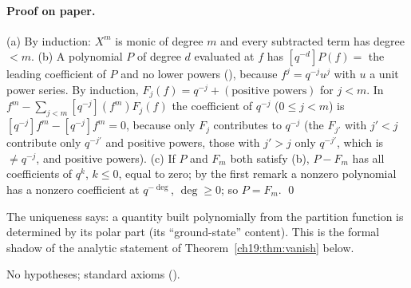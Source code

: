 \paragraph{Proof on paper.}  (a) By induction: $X^m$ is monic of degree $m$ and every subtracted term has degree $<m$.
(b) A polynomial $P$ of degree $d$ evaluated at $f$ has $[q^{-d}]P(f)=$ the leading coefficient of $P$ and no lower
powers (), because $f^j=q^{-j}u^j$ with $u$ a unit power series.  By induction,
$F_j(f)=q^{-j}+(\text{positive powers})$ for $j<m$.  In $f^m-\sum_{j<m}[q^{-j}](f^m)F_j(f)$ the coefficient of $q^{-j}$
($0\le j<m$) is $[q^{-j}]f^m-[q^{-j}]f^m=0$, because only $F_j$ contributes to $q^{-j}$ (the $F_{j'}$ with $j'<j$ contribute
only $q^{-j'}$ and positive powers, those with $j'>j$ only $q^{-j'}$, which is $\ne q^{-j}$, and positive powers).  (c) If
$P$ and $F_m$ both satisfy (b), $P-F_m$ has all coefficients of $q^{k}$, $k\le0$, equal to zero; by the first remark a
nonzero polynomial has a nonzero coefficient at $q^{-\deg}$, $\deg\ge0$; so $P=F_m$. \qed
\begin{physics}
The uniqueness says: a quantity built polynomially from the partition function is determined by its polar part
(its ``ground-state'' content).  This is the formal shadow of the analytic statement of
Theorem~\ref{ch19:thm:vanish} below.
\end{physics}
\begin{status}
No hypotheses; standard axioms ().
\end{status}

